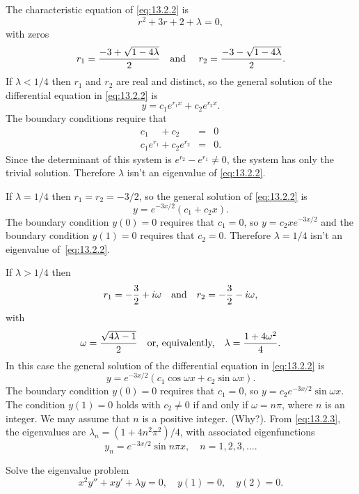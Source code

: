 \begin{examplesolution}
\solution The characteristic equation of \eqref{eq:13.2.2} is
\[
  r^{2}+3r+2+\lambda=0,
\]
with zeros
\[
  r_{1}=\frac{-3+\sqrt{1-4\lambda}}{2}\text{\quad and \quad }r_{2}=\frac{-3-\sqrt{1-4\lambda}}{2}.
\]
If $\lambda<1/4$ then $r_{1}$ and $r_{2}$ are real and distinct, so the general solution of the
differential equation in \eqref{eq:13.2.2} is
\[
  y=c_{1}e^{r_{1}x}+c_{2}e^{r_{2}x}.
\]
The boundary conditions require that
\begin{eqnarray*}
  c_{1}\phantom{e^{r_{1}}}+c_{2}\phantom{e^{r_{2}}} & = & 0 \\
  c_{1}e^{r_{1}}+c_{2}e^{r_{2}}                     & = & 0.
\end{eqnarray*}
Since the determinant of this system is $e^{r_{2}}-e^{r_{1}}\ne0$, the system has only the trivial
solution. Therefore $\lambda$ isn't an eigenvalue of \eqref{eq:13.2.2}.

If $\lambda=1/4$ then $r_{1}=r_{2}=-3/2$, so the general solution of \eqref{eq:13.2.2} is
\[
  y=e^{-3x/2}(c_{1}+c_{2}x).
\]
The boundary condition $y(0)=0$ requires that $c_{1}=0$, so $y=c_{2}xe^{-3x/2}$ and the boundary
condition $y(1)=0$ requires that $c_{2}=0$. Therefore $\lambda=1/4$ isn't an eigenvalue
of~\eqref{eq:13.2.2}.

If $\lambda>1/4$ then
\[
  r_{1}=-\frac{3}{2}+i\omega\text{\quad and\quad }r_{2}=-\frac{3}{2}-i\omega,
\]
with
\begin{equation}
  \label{eq:13.2.3}\omega=\frac{\sqrt{4\lambda-1}}{2}\text{\quad or, equivalently,\quad }\lambda=\frac{1+4\omega^{2}}{4}.
\end{equation}
In this case the general solution of the differential equation in \eqref{eq:13.2.2} is
\[
  y=e^{-3x/2}(c_{1}\cos\omega x+c_{2}\sin\omega x).
\]
The boundary condition $y(0)=0$ requires that $c_{1}=0$, so $y=c_{2}e^{-3x/2}\sin\omega x$. The condition $y(1)=0$
holds with $c_{2}\ne0$ if and only if $\omega=n\pi$, where $n$ is an integer. We may assume that $n$
is a positive integer. (Why?). From \eqref{eq:13.2.3}, the eigenvalues are
$\lambda_{n}=(1+4n^{2}\pi^{2})/4$, with associated eigenfunctions
\[
  y_{n}=e^{-3x/2}\sin n\pi x,\quad n=1,2,3,\dots.
\]
\end{examplesolution}

\begin{example}
  \label{example:13.2.2} \rm Solve the eigenvalue problem
  \begin{equation}
    \label{eq:13.2.4}x^{2}y''+xy'+\lambda y=0,\quad y(1)=0,\quad y(2)=0.
  \end{equation}
\end{example}

